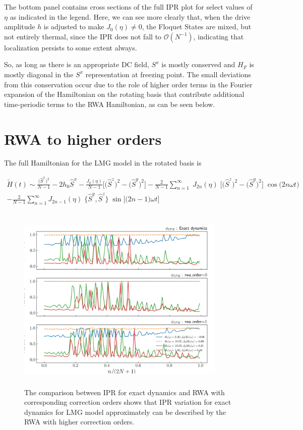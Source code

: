 \documentclass{article}
\begin{document}
The bottom panel contains cross sections of the full IPR plot for select values of $\eta$ as indicated in the legend. Here, we can see more clearly that, when the drive amplitude $h$ is adjusted to make $J_0(\eta)\neq 0$, the Floquet States are mixed, but not entirely thermal, since the IPR does not fall to $\mathcal{O}(N^{-1})$, indicating that localization persists to some extent always.

\indent So, as long as there is an appropriate DC field, $S^x$ is mostly conserved and $H_F$ is mostly diagonal in the $S^x$ representation at freezing point. The small deviations from this conservation occur due to the role of higher order terms in the Fourier expansion of the Hamiltonian on the rotating basis that contribute additional time-periodic terms to the RWA Hamiltonian, as can be seen below.


\section{RWA to higher orders}

The full Hamiltonian for the LMG model in the rotated basis is

\begin{multline*}
\tilde{H}(t)\sim \frac{\big(\hat{S}^x\big)^{2}}{N-1} - 2h_0 \hat{S}^x - \frac{J_0(\eta)}{N-1}\bigg[\big(\hat{S}^z\big)^{2} - \big(\hat{S}^y\big)^{2} \bigg] - \frac{2}{N-1}\sum^\infty_{n=1}\;J_{2n}(\eta)\;\Big[\big( \hat{S}^z\big)^2 - \big( \hat{S}^y\big)^2\Big]\;\cos{\big(2n\omega t\big)}\\
- \frac{2}{N-1}\sum^\infty_{n=1}J_{2n-1}(\eta)\;\big\{ \hat{S}^y,  \hat{S}^z \big\}  \;\sin{\Big[\big(2n-1\big)\omega t\Big]}
\end{multline*}
\begin{figure}[ht!]
\centering
\includegraphics[height = 9.0cm, width =10.0cm]{comprasion_LMG_50_highFr90_exact_nd_rwa.jpeg}
\caption{\color{blue}The comparison between IPR for exact dynamics and RWA with corresponding correction orders shows that IPR variation for exact dynamics for LMG model approximately can be described by the RWA with higher correction orders.}
\end{figure}
\end{document}

